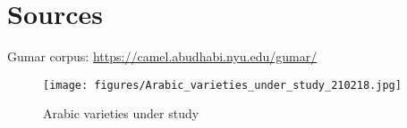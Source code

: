 \documentclass[output=paper]{langsci/langscibook}
\begin{document}

\section*{Sources}

Gumar corpus: \url{https://camel.abudhabi.nyu.edu/gumar/}

\begin{figure}[!h]
    \captionsetup{name=Map}
    \texttt{[image: figures/Arabic\_varieties\_under\_study\_210218.jpg]}
    \caption{Arabic varieties under study}
    \label{fig:ArabicVarieties}
\end{figure}
{\sloppy\printbibliography[heading=subbibliography,notkeyword=this]}
\end{document}
